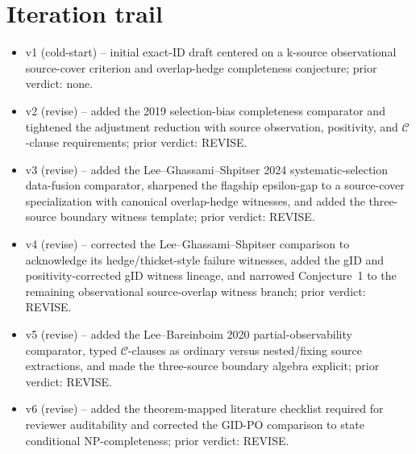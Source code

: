 \documentclass[11pt]{article}
\theoremstyle{definition}
\theoremstyle{plain}
\theoremstyle{remark}
\begin{document}
\section{Iteration trail}
\begin{itemize}[leftmargin=*]
\item v1 (cold-start) -- initial exact-ID draft centered on a k-source
observational source-cover criterion and overlap-hedge completeness
conjecture; prior verdict: none.
\item v2 (revise) -- added the 2019 selection-bias completeness comparator
and tightened the adjustment reduction with source observation, positivity,
and \(\mathcal C\)-clause requirements; prior verdict: REVISE.
\item v3 (revise) -- added the Lee--Ghassami--Shpitser 2024 systematic-selection
data-fusion comparator, sharpened the flagship epsilon-gap to a source-cover
specialization with canonical overlap-hedge witnesses, and added the
three-source boundary witness template; prior verdict: REVISE.
\item v4 (revise) -- corrected the Lee--Ghassami--Shpitser comparison to
acknowledge its hedge/thicket-style failure witnesses, added the gID and
positivity-corrected gID witness lineage, and narrowed Conjecture~1 to the
remaining observational source-overlap witness branch; prior verdict: REVISE.
\item v5 (revise) -- added the Lee--Bareinboim 2020 partial-observability
comparator, typed \(\mathcal C\)-clauses as ordinary versus nested/fixing
source extractions, and made the three-source boundary algebra explicit;
prior verdict: REVISE.
\item v6 (revise) -- added the theorem-mapped literature checklist required
for reviewer auditability and corrected the GID-PO comparison to state
conditional NP-completeness; prior verdict: REVISE.
\end{itemize}
\end{document}
